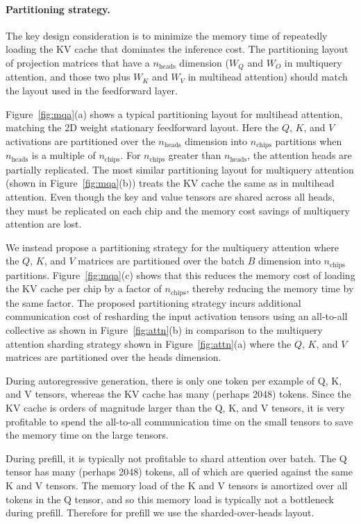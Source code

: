 \paragraph{Partitioning strategy.} The key design consideration is to minimize the memory time of repeatedly loading the KV cache that dominates the inference cost. The partitioning layout of projection matrices that have a $n_{\textrm{heads}}$ dimension ($W_Q$ and $W_O$ in multiquery attention, and those two plus $W_K$ and $W_V$ in multihead attention) should match the layout used in the feedforward layer.

Figure~\ref{fig:mqa}(a) shows a typical partitioning layout for multihead attention, matching the 2D weight stationary feedforward layout. Here the $Q$, $K$, and $V$ activations are partitioned over the $n_{\textrm{heads}}$ dimension into $n_{\textrm{chips}}$ partitions when $n_{\textrm{heads}}$ is a multiple of $n_{\textrm{chips}}$. 
For $n_{\textrm{chips}}$ greater than $n_{\textrm{heads}}$, the attention heads are partially replicated. The most similar partitioning layout for multiquery attention (shown in Figure~\ref{fig:mqa}(b)) treats the KV cache the same as in multihead attention. Even though the key and value tensors are shared across all heads, they must be replicated on each chip and the memory cost savings of multiquery attention are lost.

We instead propose a partitioning strategy for the multiquery attention where the $Q$, $K$, and $V$ matrices are partitioned over the batch $B$ dimension into $n_{\textrm{chips}}$ partitions. 
Figure~\ref{fig:mqa}(c) shows that this reduces the memory cost of loading the KV cache per chip by a factor of $n_{\textrm{chips}}$, thereby reducing the memory time by the same factor. The proposed partitioning strategy incurs additional communication cost of resharding the input activation tensors using an all-to-all collective as shown in Figure~\ref{fig:attn}(b) in comparison to the multiquery attention sharding strategy shown in Figure~\ref{fig:attn}(a) where the $Q$, $K$, and $V$ matrices are partitioned over the heads dimension. 

During autoregressive generation, there is only one token per example of Q, K, and V tensors, whereas the KV cache has many (perhaps 2048) tokens. Since the KV cache is orders of magnitude larger than the Q, K, and V tensors, it is very profitable to spend the all-to-all communication time on the small tensors to save the memory time on the large tensors.

During prefill, it is typically not profitable to shard attention over batch. The Q tensor has many (perhaps 2048) tokens, all of which are queried against the same K and V tensors. The memory load of the K and V tensors is amortized over all tokens in the Q tensor, and so this memory load is typically not a bottleneck during prefill. Therefore for prefill we use the sharded-over-heads layout.

